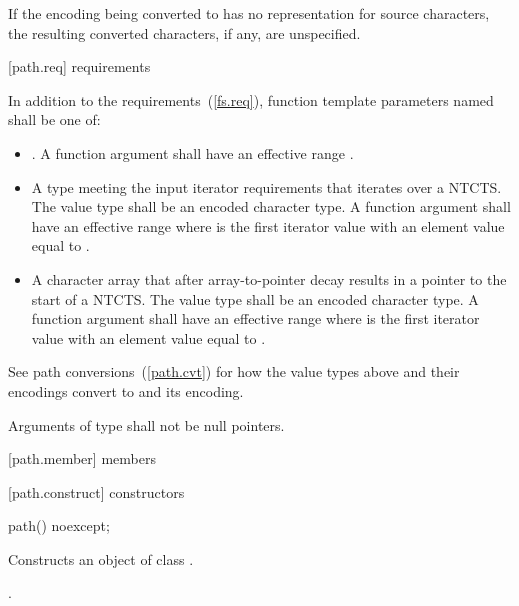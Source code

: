 \pnum
If the encoding being converted to has no representation for source
characters, the resulting converted characters, if any, are unspecified.

[path.req]{ requirements}

\pnum
In addition to the requirements~(\ref{fs.req}),
function template parameters named 
shall be one of:
\begin{itemize}
\item {}. A function
  argument   shall have an
  effective range .
\item A type meeting the input iterator requirements that iterates over a NTCTS.
  The value type shall be an encoded character type. A function argument
    shall have an effective range
   where  is the first
  iterator value with an element value equal to
  .
\item A character array that after array-to-pointer decay results in a
  pointer to the start of a NTCTS. The value type shall be an encoded character type. A
  function argument   shall
  have an effective range  where
   is the first iterator value with an element value equal to
  .
\end{itemize}

\pnum
\enternote
See path conversions~(\ref{path.cvt})
for how the value types above and their encodings convert to
 and its encoding.
\exitnote

\pnum
Arguments of type 
shall not be null pointers.

[path.member]{ members}

[path.construct]{ constructors}

\begin{itemdecl}
path() noexcept;
\end{itemdecl}

\begin{itemdescr}
\pnum
\effects Constructs an object of class .

\pnum
\postconditions {}.
\end{itemdescr}


